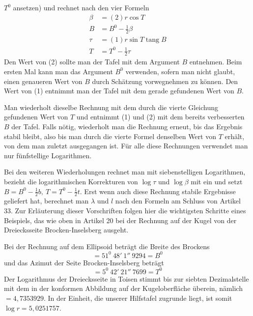%
\(T^0\) ansetzen) und rechnet nach den vier Formeln
\[
\begin{aligned}
\beta&=(2)r\cos T\\
B&=B^0-\tfrac12\beta\\
\tau&=(1)r\sin T\operatorname{tang}B\\
T&=T^0-\tfrac12\tau
\end{aligned}
\]
Den Wert von (2) sollte man der Tafel mit dem Argument \(B\) entnehmen. Beim ersten Mal kann man das Argument \(B^0\) verwenden, sofern man nicht glaubt, einen genaueren Wert von \(B\) durch Schätzung vorwegnehmen zu können. Den Wert von (1) entnimmt man der Tafel mit dem gerade gefundenen Wert von \(B\).

Man wiederholt dieselbe Rechnung mit dem durch die vierte Gleichung gefundenen Wert von \(T\) und entnimmt (1) und (2) mit dem bereits verbesserten \(B\) der Tafel. Falls nötig, wiederholt man die Rechnung erneut, bis das Ergebnis stabil bleibt, also bis man durch die vierte Formel denselben Wert von \(T\) erhält, von dem man zuletzt ausgegangen ist. Für alle diese Rechnungen verwendet man nur fünfstellige Logarithmen.

Bei den weiteren Wiederholungen rechnet man mit siebenstelligen Logarithmen, bezieht die logarithmischen Korrekturen von \(\log\tau\) und \(\log\beta\) mit ein und setzt \(B=B^0-\tfrac12b,\ T=T^0-\tfrac12t\). Erst wenn auch diese Rechnung stabile Ergebnisse geliefert hat, berechnet man \(\lambda\) und \(l\) nach den Formeln am Schluss von Artikel 33. Zur Erläuterung dieser Vorschriften folgen hier die wichtigsten Schritte eines Beispiels, das wie oben in Artikel 20 bei der Rechnung auf der Kugel von der Dreiecksseite Brocken-Inselsberg ausgeht.

Bei der Rechnung auf dem Ellipsoid beträgt die Breite des Brockens
\[
=51^0\ 48'\ 1''\ 9294=B^0
\]
und das Azimut der Seite Brocken-Inselsberg beträgt
\[
=5^0\ 42'\ 21''\ 7699=T^0
\]
Der Logarithmus der Dreiecksseite in Toisen stimmt bis zur siebten Dezimalstelle mit dem in der konformen Abbildung auf der Kugeloberfläche überein, nämlich \(=4{,}7353929\). In der Einheit, die unserer Hilfstafel zugrunde liegt, ist somit \(\log r=5{,}0251757\).

